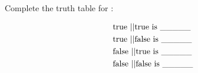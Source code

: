 Complete the truth table for \textbar\textbar:



\begin{align*}

& \text{true \textbar\textbar true is \_\_\_\_\_}\\

& \text{true \textbar\textbar false is \_\_\_\_\_}\\

& \text{false \textbar\textbar true is \_\_\_\_\_}\\

& \text{false \textbar\textbar false is \_\_\_\_\_}\\

\end{align*}

